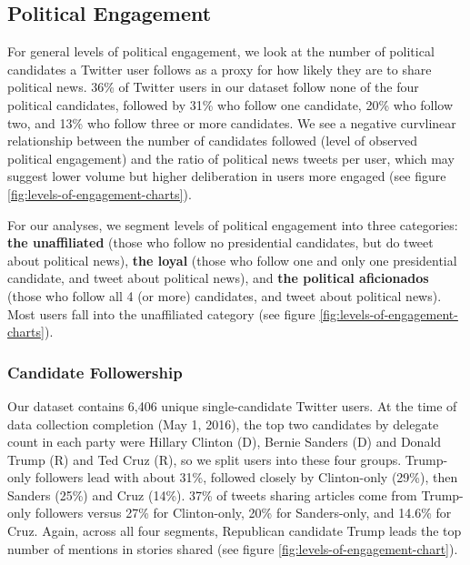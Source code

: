 \documentclass[letterpaper]{article}
\begin{document}
\subsection{Political Engagement}  
For general levels of political engagement, we look at the number of political candidates a Twitter user follows as a proxy for how likely they are to share political news. 36\% of Twitter users in our dataset follow none of the four political candidates, followed by 31\% who follow one candidate, 20\% who follow two, and 13\% who follow three or more candidates. We see a negative curvlinear relationship between the number of candidates followed (level of observed political engagement) and the ratio of political news tweets per user, which may suggest lower volume but higher deliberation in users more engaged (see figure \ref{fig:levels-of-engagement-charts}).

For our analyses, we segment levels of political engagement into three categories: \textbf{the unaffiliated} (those who follow no presidential candidates, but do tweet about political news), \textbf{the loyal} (those who follow one and only one presidential candidate, and tweet about political news), and \textbf{the political aficionados} (those who follow all 4 (or more) candidates, and tweet about political news). Most users fall into the unaffiliated category (see figure \ref{fig:levels-of-engagement-charts}).

\subsubsection{Candidate Followership}
Our dataset contains 6,406 unique single-candidate Twitter users. At the time of data collection completion (May 1, 2016), the top two candidates by delegate count in each party were Hillary Clinton (D), Bernie Sanders (D) and Donald Trump (R) and Ted Cruz (R), so we split users into these four groups. Trump-only followers lead with about 31\%, followed closely by Clinton-only (29\%), then Sanders (25\%) and Cruz (14\%). 37\% of tweets sharing articles come from Trump-only followers versus 27\% for Clinton-only, 20\% for Sanders-only, and 14.6\% for Cruz. Again, across all four segments, Republican candidate Trump leads the top number of mentions in stories shared (see figure \ref{fig:levels-of-engagement-chart}).

\end{document}
